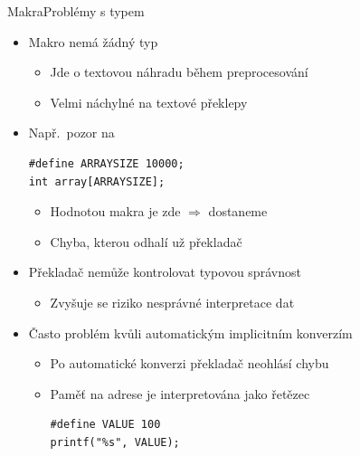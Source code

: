 \begin{frame}[fragile]{Makra}{Problémy s typem}

  \begin{itemize}
    \item Makro nemá žádný typ
    \begin{itemize}
      \item Jde o textovou náhradu během preprocesování
      \item Velmi náchylné na textové překlepy
    \end{itemize}

    \pause

    \item Např.\ pozor na
\begin{lstlisting}
#define ARRAYSIZE 10000;
int array[ARRAYSIZE];
\end{lstlisting}
    \begin{itemize}
      \item Hodnotou makra je zde  $\Rightarrow$
	 dostaneme 

      \pause

      \item Chyba, kterou odhalí už překladač
    \end{itemize}

    \pause

    \item Překladač nemůže kontrolovat typovou správnost
    \begin{itemize}
      \item Zvyšuje se riziko nesprávné interpretace dat
    \end{itemize}

    \pause

    \item Často problém kvůli automatickým implicitním konverzím
    \begin{itemize}
      \item Po automatické konverzi překladač neohlásí chybu

      \pause

      \item Paměť na adrese  je interpretována jako řetězec
\begin{lstlisting}
#define VALUE 100
printf("%s", VALUE);
\end{lstlisting}
    \end{itemize}

  \end{itemize}

\end{frame}

